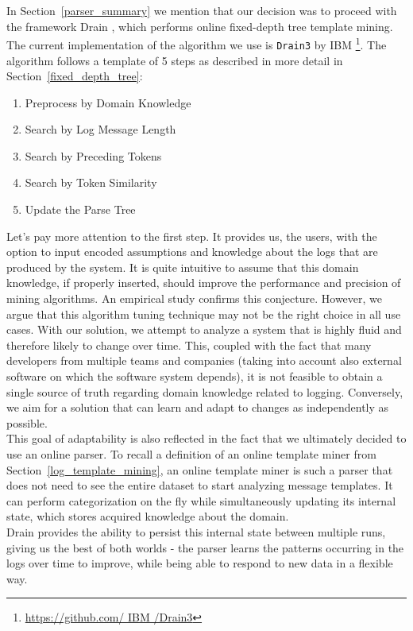  \begin{figure}[!h] 
\end{figure}

In Section~\ref{parser_summary} we mention that our decision was to proceed with the framework Drain \cite{drain2017}, which performs online fixed-depth tree template mining. The current implementation of the algorithm we use is \texttt{Drain3} by IBM \footnote{\url{https://github.com/ IBM /Drain3}}. The algorithm follows a template of 5 steps as described in more detail in Section~\ref{fixed_depth_tree}:
\begin{enumerate}
    \item Preprocess by Domain Knowledge
    \item Search by Log Message Length
    \item Search by Preceding Tokens
    \item Search by Token Similarity
    \item Update the Parse Tree
\end{enumerate}

Let's pay more attention to the first step. It provides us, the users, with the option to input encoded assumptions and knowledge about the logs that are produced by the system.
It is quite intuitive to assume that this domain knowledge, if properly inserted, should improve the performance and precision of mining algorithms. An empirical study \cite{he2016} confirms this conjecture.
However, we argue that this algorithm tuning technique may not be the right choice in all use cases. With our solution, we attempt to analyze a system that is highly fluid and therefore likely to change over time. This, coupled with the fact that many developers from multiple teams and companies (taking into account also external software on which the software system depends), it is not feasible to obtain a single source of truth regarding domain knowledge related to logging. Conversely, we aim for a solution that can learn and adapt to changes as independently as possible.\\

This goal of adaptability is also reflected in the fact that we ultimately decided to use an online parser.
To recall a definition of an online template miner from Section~\ref{log_template_mining}, an online template miner is such a parser that does not need to see the entire dataset to start analyzing message templates. It can perform categorization on the fly while simultaneously updating its internal state, which stores acquired knowledge about the domain.\\
Drain provides the ability to persist this internal state between multiple runs, giving us the best of both worlds - the parser learns the patterns occurring in the logs over time to improve, while being able to respond to new data in a flexible way.

